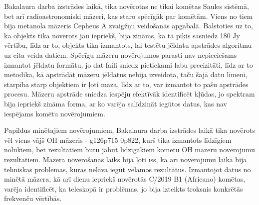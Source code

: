 Bakalaura darba izstrādes laikā, tika novērotas ne tikai komētas Saules sistēmā, bet arī radioastronomiski māzeri, kas staro spēcīgāk par komētām. Viens no tiem bija metanola māzeris Cepheus A zvaigžņu veidošanās apgabalā. Balstoties uz to, ka objekts tika novērots jau iepriekš, bija zināms, ka tā pīķis sasniedz 180 Jy vērtību, līdz ar to, objekts tika izmantots, lai testētu jēldatu apstrādes algoritmu uz cita veida datiem. Spēcīgu māzeru novērojumos parasti nav nepieciešams izmantot jēldatu formātu, jo dat faili sniedz pietiekami labu precizitāti, līdz ar to metodika, kā apstrādāt māzeru jēldatus nebija izveidota, taču šajā datu līmenī, starpība starp objektiem ir ļoti maza, līdz ar to, var izmantot to pašu apstrādes procesu. Māzeru apstrāde sniedza iespēju efektīvāk identificēt kļūdas, jo spektram bija iepriekš zināma forma, ar ko varēja salīdzināt iegūtos datus, kas nav iespējams komētu novērojumiem.

Papildus minētajiem novērojumiem, Bakalaura darba izstrādes laikā tika novērots vēl viens vājš OH māzeris - g126p715 0p822, kurš tika izmantots līdzīgiem nolūkiem, bet rezultātiem būtu jābūt līdzīgākiem komētu OH māzeru novērojumu rezultātiem. Māzera novērošanas laiks bija ļoti īss, kā arī novērojumu laikā bija tehniskas problēmas, kuras neļāva iegūt vēlamos rezultātus. Izmantojot datus no minētā māzera, kā arī dienu iepriekš novērotās C/2019 B1 (Africano) komētas, varēja identificēt, ka teleskopā ir problēmas, jo bija izteikts troksnis konkrētās frekvenču vērtībās.

























